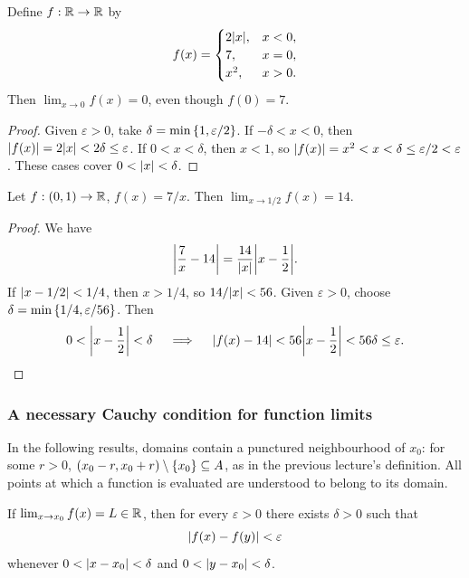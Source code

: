 \documentclass[11pt,a4paper]{amsart}
\begin{document}
\begin{example}
  Define \(f:\mathbb{R}\to\mathbb{R}\) by
  \[
    f(x)=
    \begin{cases}
      2\lvert x\rvert,&x<0,\\
      7,&x=0,\\
      x^2,&x>0.
    \end{cases}
  \]
  Then \(\lim_{x\to0}f(x)=0\), even though \(f(0)=7\).
\end{example}

\begin{proof}
  Given \(\varepsilon>0\), take
  \(\delta=\min\left\lbrace1,\varepsilon/2\right\rbrace\). If \(-\delta<x<0\),
  then \(\lvert f(x)\rvert=2\lvert x\rvert<2\delta\leq\varepsilon\).
  If \(0<x<\delta\), then \(x<1\), so
  \(\lvert f(x)\rvert=x^2<x<\delta\leq\varepsilon/2<\varepsilon\).
  These cases cover \(0<\lvert x\rvert<\delta\).
\end{proof}

\begin{example}
  Let \(f:(0,1)\to\mathbb{R}\), \(f(x)=7/x\). Then
  \(\lim_{x\to1/2}f(x)=14\).
\end{example}

\begin{proof}
  We have
  \[
    \abs*{\frac7x-14}=\frac{14}{\abs{x}}\abs*{x-\frac12}.
  \]
  If \(\lvert x-1/2\rvert<1/4\), then \(x>1/4\), so
  \(14/\lvert x\rvert<56\). Given \(\varepsilon>0\), choose
  \(\delta=\min\left\lbrace1/4,\varepsilon/56\right\rbrace\). Then
  \[
    0<\abs*{x-\frac12}<\delta
    \quad\implies\quad
    \abs{f(x)-14}<56\abs*{x-\frac12}<56\delta\leq\varepsilon.
  \]
\end{proof}

\subsubsection{A necessary Cauchy condition for function limits}

In the following results, domains contain a punctured neighbourhood of
\(x_0\): for some \(r>0\),
\((x_0-r,x_0+r)\setminus\left\lbrace x_0\right\rbrace\subseteq A\), as in the
previous lecture's definition. All points at which a function is
evaluated are understood to belong to its domain.

\begin{theorem}\label{thm:function-cauchy-necessary}
  If \(\lim_{x\to x_0}f(x)=L\in\mathbb{R}\), then for every
  \(\varepsilon>0\) there exists \(\delta>0\) such that
  \[
    \lvert f(x)-f(y)\rvert<\varepsilon
  \]
  whenever \(0<\lvert x-x_0\rvert<\delta\) and
  \(0<\lvert y-x_0\rvert<\delta\).
\end{theorem}
\end{document}
